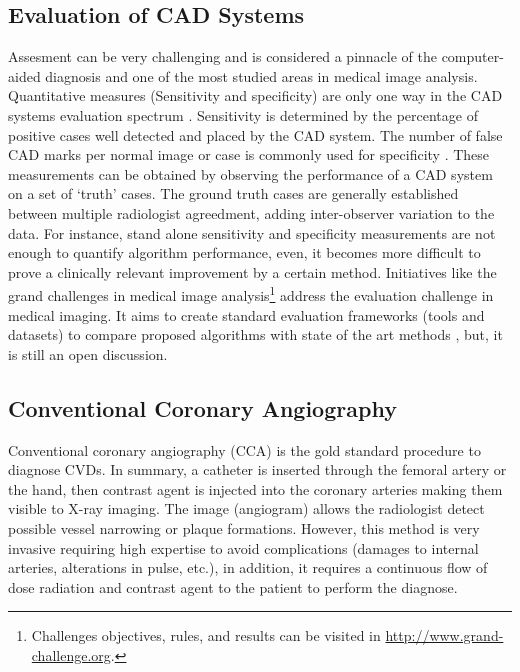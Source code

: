 \subsection{Evaluation of CAD Systems}

Assesment can be very challenging and is considered a pinnacle of the computer-aided diagnosis and one of the most studied areas in medical image analysis. Quantitative measures (Sensitivity and specificity) are only one way in the CAD systems evaluation spectrum \citep{Ginneken2011}. Sensitivity is determined by the percentage of positive cases well detected and placed by the CAD system. The number of false CAD marks per normal image or case is commonly used for specificity \citep{Castellino2005}. These measurements can be obtained by observing the performance of a CAD system on a set of ‘truth’ cases. The ground truth cases are generally established between multiple radiologist agreedment, adding inter-observer variation to the data. For instance, stand alone sensitivity and specificity measurements are not enough to quantify algorithm performance, even, it becomes more difficult to prove a clinically relevant improvement by a certain method. 
Initiatives like the grand challenges in medical image analysis\footnote{Challenges objectives, rules, and results can be visited in \href{http://www.grand-challenge.org}{http://www.grand-challenge.org}.} address the evaluation challenge in medical imaging. It aims to create standard evaluation frameworks (tools and datasets) to compare proposed algorithms with state of the art methods \citep{Hameeteman2011, Schaap2009, Kirisli2013} , but, it is still an open discussion.

\subsection{Conventional Coronary Angiography}

Conventional coronary angiography (CCA) is the gold standard procedure to diagnose CVDs. In summary, a catheter is inserted through the femoral artery or the hand, then contrast agent is injected into the coronary arteries making them visible to X-ray imaging. The image (angiogram) allows the radiologist detect possible vessel narrowing or plaque formations. However, this method is very invasive requiring high expertise to avoid complications (damages to internal arteries, alterations in pulse, etc.), in addition, it requires a continuous flow of dose radiation and contrast agent to the patient to perform the diagnose.

